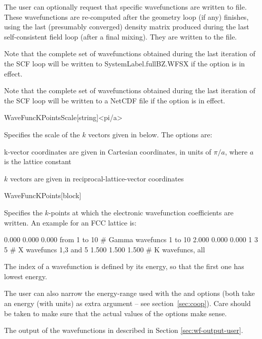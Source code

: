 The user can optionally request that specific wavefunctions are
written to file. These wavefunctions are re-computed after the
geometry loop (if any) finishes, using the last (presumably converged)
density matrix produced during the last self-consistent field loop
(after a final mixing). They are written to the
 file.

Note that the complete set of wavefunctions obtained during the last
iteration of the SCF loop will be written to SystemLabel.fullBZ.WFSX
if the  option is in effect.

Note that the complete set of wavefunctions obtained during the last
iteration of the SCF loop will be written to a NetCDF file
 if the  option is in effect.

\begin{fdfentry}{WaveFuncKPointsScale}[string]<pi/a>

    Specifies the scale of the $k$ vectors given in
     below.  The options are:
    \begin{fdfoptions}
      \option[pi/a]%
      k-vector coordinates are given in Cartesian coordinates, in units
      of $\pi/a$, where $a$ is the lattice constant
  
      \option[ReciprocalLatticeVectors]%
      $k$ vectors are given in reciprocal-lattice-vector coordinates
  
    \end{fdfoptions}
  
  \end{fdfentry}
  
  \begin{fdfentry}{WaveFuncKPoints}[block]
  
    Specifies the $k$-points at which the electronic wavefunction
    coefficients are written.  An example for an FCC lattice is:
    \begin{fdfexample}
       0.000  0.000  0.000  from 1 to 10   # Gamma wavefuncs 1 to 10
       2.000  0.000  0.000  1 3 5          # X wavefuncs 1,3 and 5
       1.500  1.500  1.500                 # K wavefuncs, all
    \end{fdfexample}
    The index of a wavefunction is defined by its energy, so that the
    first one has lowest energy.
  
    The user can also narrow the energy-range used with the
     and  options (both take
    an energy (with units) as extra argument -- see
    section~\ref{sec:coop}). Care should be taken to make sure that the
    actual values of the options make sense.
  
    The output of the wavefunctions in described in Section
    \ref{sec:wf-output-user}.
  
  \end{fdfentry}
  
